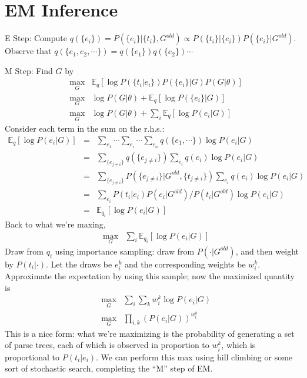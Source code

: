 \documentclass[12pt]{article}
\begin{document}
\section{EM Inference}
E Step: Compute $q(\{e_i\})=P(\{e_i\} | \{t_i\},G^{old})\propto P(\{t_i\}|\{e_i\})P(\{e_i\}|G^{old})$.
Observe that $q(\{e_1,e_2,\cdots\})=q(\{e_1\})q(\{e_2\})\cdots$

M Step: Find $G$ by
\begin{eqnarray*}
&\max_G& \mathbb{E}_q \left[ \log P(\{t_i|e_i\}) P(\{e_i\}|G)P(G|\theta) \right]\\
&\max_G& \log P(G|\theta) + \mathbb{E}_q \left[ \log P(\{e_i\}|G)\right] \\ 
&\max_G& \log P(G|\theta) + \sum_i \mathbb{E}_q \left[ \log P(e_i | G) \right]
\end{eqnarray*}
Consider each term in the sum on the r.h.s.:
\begin{eqnarray*}
\mathbb{E}_q \left[ \log P(e_i | G) \right] &=& \sum_{e_1}\cdots\sum_{e_i}\cdots \sum_{e_n} q(\{e_1,\cdots\})\log P(e_i|G)\\
&=& \sum_{\{e_{j\not=i}\}} q(\{e_{j\not= i}\})\sum_{e_i}q(e_i)\log P(e_i|G)\\
&=& \sum_{\{e_{j\not=i}\}} P(\{e_{j\not= i}\}|G^{old}, \{t_{j\not= i}\})\sum_{e_i}q(e_i)\log P(e_i|G)\\
&=& \sum_{e_i}  P(t_i|e_i)P(e_i|G^{old})/P(t_i|G^{old}) \log P(e_i|G)\\
&=& \mathbb{E}_{q_i} \left[ \log P(e_i|G) \right]
\end{eqnarray*}
Back to what we're maxing,
\begin{eqnarray*}
&\max_G& \sum_i \mathbb{E}_{q_i} \left[ \log P(e_i|G) \right]
\end{eqnarray*}
Draw from $q_i$ using importance sampling: draw from $P(\cdot | G^{old})$, and then weight by $P(t_i | \cdot)$.
Let the draws be $e_i^k$ and the corresponding weights be $w_i^k$.
Approximate the expectation by using this sample; now the maximized quantity is
\begin{eqnarray*}
&\max_G& \sum_i \sum_k w_i^k \log P(e_i|G)\\
&\max_G& \prod_{i,k}  \left( P(e_i|G) \right)^{w_i^k}
\end{eqnarray*}
This is a nice form: what we're maximizing is the probability of generating a set of parse trees, each of which is observed in proportion to $w_i^k$, which is proportional to $P(t_i|e_i)$.
We can perform this max using hill climbing or some sort of stochastic search, completing the ``M'' step of EM.
\end{document}
